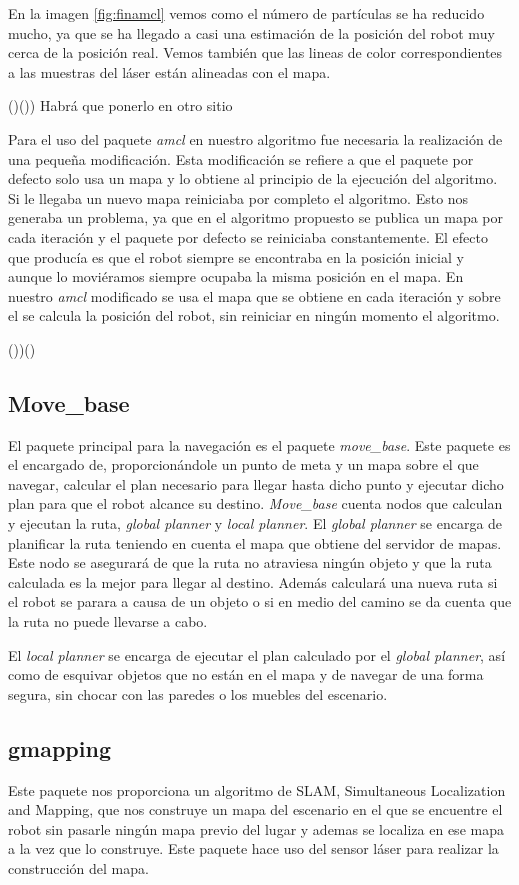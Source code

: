 En la imagen \ref{fig:finamcl} vemos como el número de partículas se ha reducido mucho, ya que se ha llegado a casi una estimación de la posición del robot muy cerca de la posición real. Vemos también que las lineas de color correspondientes a las muestras del láser están alineadas con el mapa.

()()) Habrá que ponerlo en otro sitio

Para el uso del paquete \textit{amcl} en nuestro algoritmo fue necesaria la realización de una pequeña modificación. Esta modificación se refiere a que el paquete por defecto solo usa un mapa y lo obtiene al principio de la ejecución del algoritmo. Si le llegaba un nuevo mapa reiniciaba por completo el algoritmo. Esto nos generaba un problema, ya que en el algoritmo propuesto se publica un mapa por cada iteración y el paquete por defecto se reiniciaba constantemente. El efecto que producía es que el robot siempre se encontraba en la posición inicial y aunque lo moviéramos siempre ocupaba la misma posición en el mapa. En nuestro \textit{amcl} modificado se usa el mapa que se obtiene en cada iteración y sobre el se calcula la posición del robot, sin reiniciar en ningún momento el algoritmo.

())()

\subsection{Move\_base}
\label{sec:movebase}
El paquete principal para la navegación es el paquete \textit{move\_base}\footnotemark. Este paquete es el encargado de, proporcionándole un punto de meta y un mapa sobre el que navegar, calcular el plan necesario para llegar hasta dicho punto y ejecutar dicho plan para que el robot alcance su destino. \textit{Move\_base} cuenta nodos que calculan y ejecutan la ruta, \textit{global planner} y \textit{local planner}. El \textit{global planner} se encarga de planificar la ruta teniendo en cuenta el mapa que obtiene del servidor de mapas. Este nodo se asegurará de que la ruta no atraviesa ningún objeto y que la ruta calculada es la mejor para llegar al destino. Además calculará una nueva ruta si el robot se parara a causa de un objeto o si en medio del camino se da cuenta que la ruta no puede llevarse a cabo. 

El \textit{local planner} se encarga de ejecutar el plan calculado por el \textit{global planner}, así como de esquivar objetos que no están en el mapa y de navegar de una forma segura, sin chocar con las paredes o los muebles del escenario.

\subsection{gmapping}
\label{sec:gmapping}
Este paquete nos proporciona un algoritmo de SLAM, Simultaneous Localization and Mapping, que nos construye un mapa del escenario en el que se encuentre el robot sin pasarle ningún mapa previo del lugar y ademas se localiza en ese mapa a la vez que lo construye. Este paquete hace uso del sensor láser para realizar la construcción del mapa.